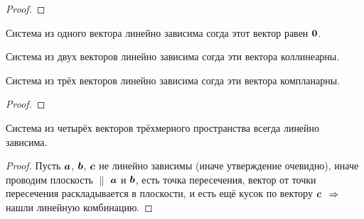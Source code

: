 \begin{proof}\end{proof}

\begin{proposition}
    Система из одного вектора линейно зависима согда этот вектор равен $\bm{0}$.
\end{proposition}

\begin{proposition}
    Система из двух векторов линейно зависима согда эти вектора коллинеарны.
\end{proposition}

\begin{theorem}
    Система из трёх векторов линейно зависима согда эти вектора компланарны.
\end{theorem}
\begin{proof}
\end{proof}

\begin{theorem}
    Система из четырёх векторов трёхмерного пространства всегда линейно зависима.
\end{theorem}
\begin{proof}
    Пусть $\bm{a}$, $\bm{b}$, $\bm{c}$ не линейно зависимы (иначе утверждение очевидно), иначе проводим плоскость $\parallel$ $\bm{a}$ и $\bm{b}$, есть точка пересечения, вектор от точки пересечения раскладывается в плоскости, и есть ещё кусок по вектору $\bm{c}$ $\;\Rightarrow\;$ нашли линейную комбинацию.
\end{proof}


